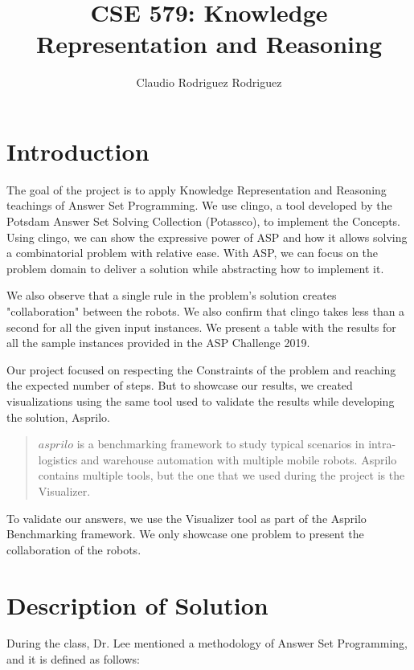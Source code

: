 \documentclass{IEEEtran}
\begin{document}
\title{CSE 579: Knowledge Representation and Reasoning}
\author{Claudio Rodriguez Rodriguez}
\maketitle

\section{Introduction}

The goal of the project is to apply Knowledge Representation and Reasoning teachings of Answer Set Programming. We use clingo, a tool developed by the Potsdam Answer Set Solving Collection (Potassco), to implement the Concepts. Using clingo, we can show the expressive power of ASP and how it allows solving a combinatorial problem with relative ease. With ASP, we can focus on the problem domain to deliver a solution while abstracting how to implement it.

We also observe that a single rule in the problem's solution creates "collaboration" between the robots. We also confirm that clingo takes less than a second for all the given input instances. We present a table with the results for all the sample instances provided in the ASP Challenge 2019\cite{cse579:AutomatedWarehouseScenario}. 

Our project focused on respecting the Constraints of the problem and reaching the expected number of steps. But to showcase our results, we created visualizations using the same tool used to validate the results while developing the solution, Asprilo. 

\begin{quotation}
  $asprilo$ is a benchmarking framework to study typical scenarios in intra-logistics and warehouse automation with multiple mobile robots. 
  Asprilo contains multiple tools, but the one that we used during the project is the Visualizer.\cite{cse579:asprilo}
\end{quotation}
 
To validate our answers, we use the Visualizer tool as part of the Asprilo Benchmarking framework. We only showcase one problem to present the collaboration of the robots.

\section{Description of Solution}

During the class, Dr. Lee mentioned a methodology of Answer Set Programming\cite{cse579:Methodology}, and it is defined as follows:
\end{document}

